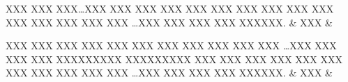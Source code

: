\documentclass{scrbook}
\begin{document}
\begin{pages}
\beginnumbering
\begin{Leftside}
\begin{astanza} XXX XXX XXX\dots  XXX XXX XXX XXX XXX XXX XXX XXX XXX XXX XXX XXX XXX XXX XXX \dots XXX XXX XXX XXX XXXXXX. &
XXX \& \end{astanza}
\endnumbering
\end{Leftside}

\begin{Rightside}
\beginnumbering
\begin{astanza} XXX XXX XXX XXX XXX XXX XXX XXX XXX XXX XXX \dots XXX XXX XXX XXX XXXXXXXXX XXXXXXXXX XXX XXX XXX XXX XXX XXX XXX XXX XXX XXX XXX \dots XXX XXX XXX XXX XXXXXX. &
XXX \& \end{astanza}
\endnumbering
\end{Rightside}
\end{pages}
\Pages
\end{document}
